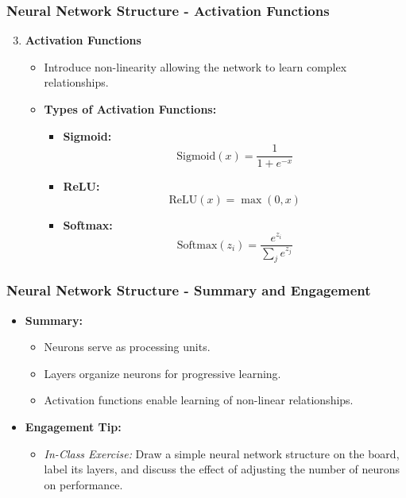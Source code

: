 \documentclass[aspectratio=169]{beamer}
\begin{document}
\begin{frame}[fragile]
    \frametitle{Neural Network Structure - Activation Functions}
    \begin{enumerate}
        \setcounter{enumi}{2}
        \item \textbf{Activation Functions}
        \begin{itemize}
            \item Introduce non-linearity allowing the network to learn complex relationships.
            \item \textbf{Types of Activation Functions:}
            \begin{itemize}
                \item \textbf{Sigmoid:} 
                \[
                \text{Sigmoid}(x) = \frac{1}{1 + e^{-x}}
                \]
                \item \textbf{ReLU:} 
                \[
                \text{ReLU}(x) = \max(0, x)
                \]
                \item \textbf{Softmax:} 
                \[
                \text{Softmax}(z_i) = \frac{e^{z_i}}{\sum_{j} e^{z_j}}
                \]
            \end{itemize}
        \end{itemize}
    \end{enumerate}
\end{frame}

\begin{frame}[fragile]
    \frametitle{Neural Network Structure - Summary and Engagement}
    \begin{itemize}
        \item \textbf{Summary:} 
        \begin{itemize}
            \item Neurons serve as processing units.
            \item Layers organize neurons for progressive learning.
            \item Activation functions enable learning of non-linear relationships.
        \end{itemize}
        \item \textbf{Engagement Tip:} 
        \begin{itemize}
            \item \textit{In-Class Exercise:} Draw a simple neural network structure on the board, label its layers, and discuss the effect of adjusting the number of neurons on performance.
        \end{itemize}
    \end{itemize}
\end{frame}
\end{document}
